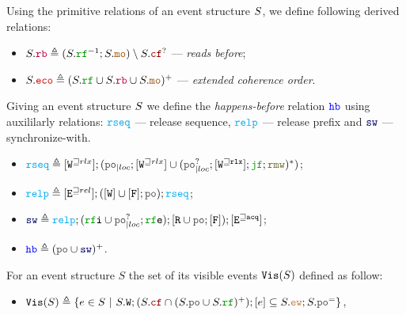 \documentclass[12pt]{article}
\begin{document}
\begin{definition}
  Using the primitive relations of an event structure $S$,
  we define following derived relations:
  \begin{itemize}
    \item $\lES.\lRB \defeq (\lES.\lRF^{-1};\lES.\lMO) \setminus \lES.\lCF^?$ --- 
      \emph{reads before};
    \item $\lES.\lECO \defeq (\lES.\lRF \cup \lES.\lRB \cup \lES.\lMO)^+$ --- 
      \emph{extended coherence order}.
  \end{itemize}
\end{definition}

\begin{definition}
  Giving an event structure $S$ we define the \emph{happens-before} relation $\lHB$
  using auxililarly relations: 
  $\lRSEQ$ --- release sequence,
  $\lRELP$ --- release prefix and
  $\lSW$ --- synchronize-with.
  \begin{itemize}
  \item $\lRSEQ \defeq [\lWsqeq{rlx}];(\lmakeLoc{\lPO};[\lWsqeq{rlx}] \cup 
    (\lmakeLoc{\lPO^?};[\lWsqeq{\rlx}];\lJF;\lRMW)^*)$;
  \item $\lRELP \defeq [\lEsqeq{rel}];([\lW] \cup [\lF];\lPO);\lRSEQ$;
  \item $\lSW \defeq \lRELP; (\lRFI \cup \lmakeLoc{\lPO^?};\lRFE); [\lR \cup \lPO;[\lF]);[\lEsqeq{\acq}]$;
  \item $\lHB \defeq (\lPO \cup \lSW)^+$.
  \end{itemize}
\end{definition}


\begin{definition}
  For an event structure $S$ the set of its visible events ${\mathtt{Vis}}(S)$ defined as follow:
  \begin{itemize}
    \item $\lVIS(S) \defeq 
      \{ e \in S ~|~ S.\lW;(S.\lCF \cap (S.\lPO \cup S.\lRF)^+);[e] \subseteq 
         S.\lEW;S.\lPO^=
      \}$,
  \end{itemize}
\end{definition}
\end{document}
